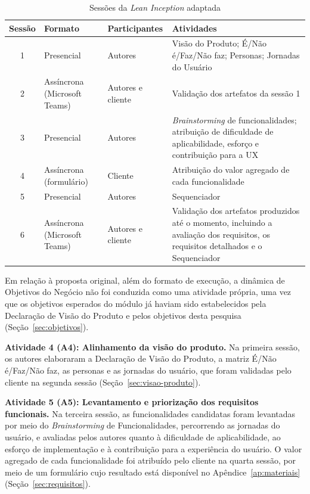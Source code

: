 \begin{table}[htb]
\caption{Sessões da \textit{Lean Inception} adaptada}
\label{tab:sessoes-lean-inception}
\centering
\small
\begin{tabularx}{\textwidth}{c>{\raggedright\arraybackslash}p{3.2cm}>{\raggedright\arraybackslash}p{2.8cm}>{\raggedright\arraybackslash}X}
\hline
\textbf{Sessão} & \textbf{Formato} & \textbf{Participantes} & \textbf{Atividades} \\
\hline
1 & Presencial & Autores & Visão do Produto; É/Não é/Faz/Não faz; Personas; Jornadas do Usuário \\
\hline
2 & Assíncrona (Microsoft Teams) & Autores e cliente & Validação dos artefatos da sessão 1 \\
\hline
3 & Presencial & Autores & \textit{Brainstorming} de funcionalidades; atribuição de dificuldade de aplicabilidade, esforço e contribuição para a UX \\
\hline
4 & Assíncrona (formulário) & Cliente & Atribuição do valor agregado de cada funcionalidade \\
\hline
5 & Presencial & Autores & Sequenciador \\
\hline
6 & Assíncrona (Microsoft Teams) & Autores e cliente & Validação dos artefatos produzidos até o momento, incluindo a avaliação dos requisitos, os requisitos detalhados e o Sequenciador \\
\hline
\end{tabularx}
\end{table}

Em relação à proposta original, além do formato de execução, a dinâmica de Objetivos do Negócio não foi conduzida como uma atividade própria, uma vez que os objetivos esperados do módulo já haviam sido estabelecidos pela Declaração de Visão do Produto e pelos objetivos desta pesquisa (Seção~\ref{sec:objetivos}).

\textbf{Atividade 4 (A4): Alinhamento da visão do produto.} Na primeira sessão, os autores elaboraram a Declaração de Visão do Produto, a matriz É/Não é/Faz/Não faz, as personas e as jornadas do usuário, que foram validadas pelo cliente na segunda sessão (Seção~\ref{sec:visao-produto}).

\textbf{Atividade 5 (A5): Levantamento e priorização dos requisitos funcionais.} Na terceira sessão, as funcionalidades candidatas foram levantadas por meio do \textit{Brainstorming} de Funcionalidades, percorrendo as jornadas do usuário, e avaliadas pelos autores quanto à dificuldade de aplicabilidade, ao esforço de implementação e à contribuição para a experiência do usuário. O valor agregado de cada funcionalidade foi atribuído pelo cliente na quarta sessão, por meio de um formulário cujo resultado está disponível no Apêndice~\ref{ap:materiais} (Seção~\ref{sec:requisitos}).

